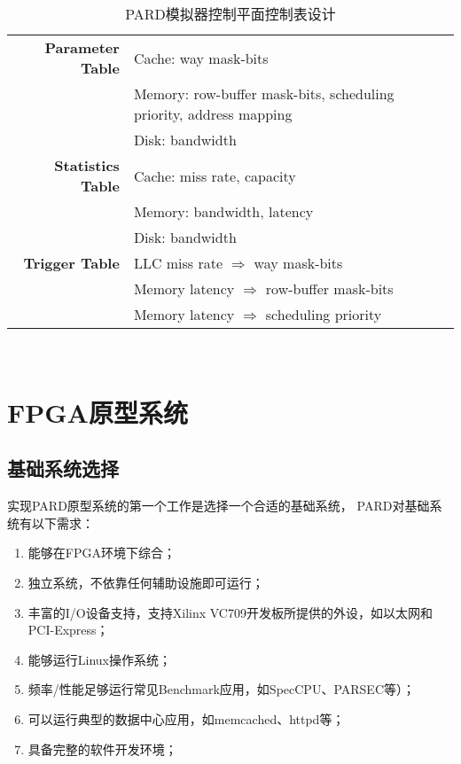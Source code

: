 \begin{table}[ht]
  \centering
  \begin{minipage}[t]{0.9\linewidth}
  \caption{PARD模拟器控制平面控制表设计}
  \label{tab:pard-sim-cp}
    \begin{tabular*}{\linewidth}{rl}
      \toprule[1.5pt]
        \textbf{Parameter Table}  &   Cache: way mask-bits                               \\
                                  &   Memory: row-buffer mask-bits, scheduling priority, address mapping \\
                                  &   Disk: bandwidth                                    \\
        \hline
        \textbf{Statistics Table} &   Cache: miss rate, capacity                         \\
                                  &   Memory: bandwidth, latency                         \\
                                  &   Disk: bandwidth                                    \\
        \hline
        \textbf{Trigger Table}    &   LLC miss rate $\Rightarrow$ way mask-bits          \\
                                  &   Memory latency $\Rightarrow$ row-buffer mask-bits  \\
                                  &   Memory latency $\Rightarrow$ scheduling priority   \\
      \bottomrule[1.5pt]
    \end{tabular*}\\[2pt]
  \end{minipage}
\end{table}

\section{FPGA原型系统}

\subsection{基础系统选择}

实现PARD原型系统的第一个工作是选择一个合适的基础系统，
PARD对基础系统有以下需求：

\begin{enumerate}[leftmargin=2\parindent, nolistsep, label=\arabic*）]
  \item 能够在FPGA环境下综合；
  \item 独立系统，不依靠任何辅助设施即可运行；
  \item 丰富的I/O设备支持，支持Xilinx VC709开发板所提供的外设，如以太网和PCI-Express；
  \item 能够运行Linux操作系统；
  \item 频率/性能足够运行常见Benchmark应用，如SpecCPU、PARSEC等）；
  \item 可以运行典型的数据中心应用，如memcached、httpd等；
  \item 具备完整的软件开发环境；
\end{enumerate}

